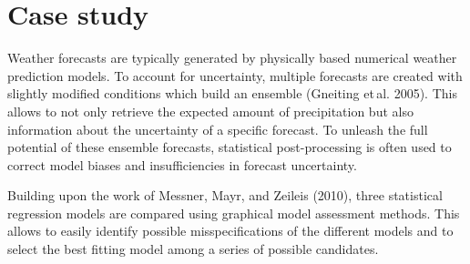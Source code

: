 \documentclass[twoside]{report}
\begin{document}
\maketitle



\section{Case study}


Weather forecasts are typically generated by physically based numerical weather
prediction models. To account for uncertainty, multiple forecasts are created
with slightly modified conditions which build an ensemble (Gneiting et\,al.
2005). This allows to not only retrieve the expected amount of precipitation
but also information about the uncertainty of a specific forecast.
To unleash the full potential of these ensemble forecasts, statistical
post-processing is often used to correct model biases and insufficiencies in
forecast uncertainty.

Building upon the work of Messner, Mayr, and Zeileis (2010), three statistical
regression models are compared using graphical model assessment methods.
This allows to easily identify possible misspecifications of the different
models and to select the best fitting model among a series of possible candidates.



\end{document}
